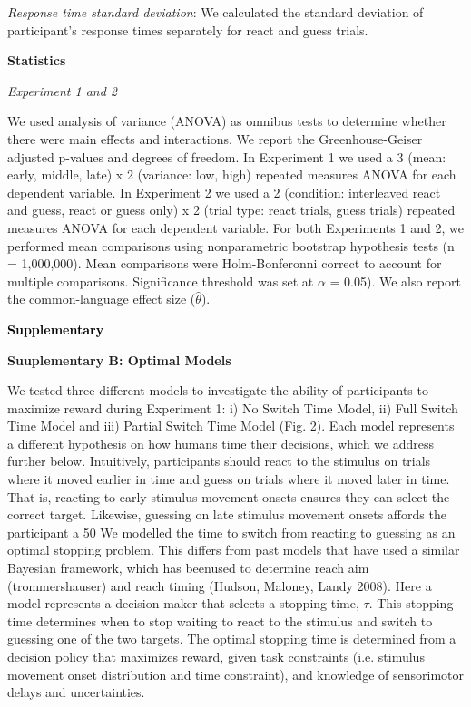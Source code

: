 \documentclass[12pt,letterpaper]{article}
\newcommand{\SectionHeader}[1]{\noindent\textbf{\Large{\textcolor{black}{#1}}}\normalsize }
\begin{document}
\emph{Response time standard deviation}: We calculated the standard deviation of participant’s response times separately for react and guess trials.

\noindent\textbf{\textcolor{mydarkblue}{Statistics}}

\noindent\emph{Experiment 1 and 2}

We used analysis of variance (ANOVA) as omnibus tests to determine whether there were main effects and interactions. We report the Greenhouse-Geiser adjusted p-values and degrees of freedom. In Experiment 1 we used a 3 (mean: early, middle, late) x 2 (variance: low, high) repeated measures ANOVA for each dependent variable. In Experiment 2 we used a 2 (condition: interleaved react and guess, react or guess only) x 2 (trial type: react trials, guess trials) repeated measures ANOVA for each dependent variable. For both Experiments 1 and 2, we performed mean comparisons using nonparametric bootstrap hypothesis tests (n = 1,000,000). Mean comparisons were Holm-Bonferonni correct to account for multiple comparisons. Significance threshold was set at $\alpha$ = 0.05). We also report the common-language effect size ($\hat{\theta}$).


\SectionHeader{Supplementary}

\noindent\textbf{\textcolor{mydarkblue}{Suuplementary B: Optimal Models}}

We tested three different models to investigate the ability of participants to maximize reward during Experiment 1: i) No Switch Time Model, ii) Full Switch Time Model and iii) Partial Switch Time Model (Fig. 2). Each model represents a different hypothesis on how humans time their decisions, which we address further below. Intuitively, participants should react to the stimulus on trials where it moved earlier in time and guess on trials where it moved later in time. That is, reacting to early stimulus movement onsets ensures they can select the correct target. Likewise, guessing on late stimulus movement onsets affords the participant a 50%
We modelled the time to switch from reacting to guessing as an optimal stopping problem. This differs from past models that have used a similar Bayesian framework, which has beenused to determine reach aim (trommershauser) and reach timing (Hudson, Maloney, Landy 2008). Here a model represents a decision-maker that selects a stopping time, $\tau$. This stopping time determines when to stop waiting to react to the stimulus and switch to guessing one of the two targets. The optimal stopping time is determined from a decision policy that maximizes reward, given task constraints (i.e. stimulus movement onset distribution and time constraint), and knowledge of sensorimotor delays and uncertainties.
\end{document}
